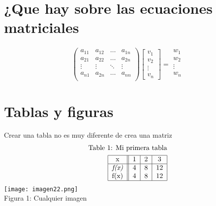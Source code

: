 \documentclass{article}
\begin{document}
    \section{¿Que hay sobre las ecuaciones matriciales} 
    \begin{align*}
        \begin{pmatrix}
            a_{11} & a_{12} & \dots & a_{1n} \\
            a_{21} & a_{22} & \dots & a_{2n} \\
            \vdots & \vdots & \ddots & \vdots \\
            a_{n1} & a_{2n} & \dots & a_{nn} \\
        \end{pmatrix}
        \begin{bmatrix}
            v_1 \\
            v_2 \\
            \vdots \\
            v_n
        \end{bmatrix}
        =
        \begin{matrix}
            w_1 \\
            w_2 \\
            \vdots \\
            w_n \\
        \end{matrix}        
    \end{align*}
    \section{Tablas y figuras}
    Crear una tabla no es muy diferente de crea una matriz
    \begin{align*}
        \text{Table 1: Mi primera tabla} \\
        \begin{tabular}{|c||c|c|c|}
             \hline
             x & 1 & 2 & 3 \\
             \hline
             \textit{f(x)} & 4 & 8 & 12 \\
             f(x) & 4 & 8 & 12 \\
             \hline
        \end{tabular}
    \end{align*}
    \texttt{[image: imagen22.png]} \\
    \centering Figura 1: Cualquier imagen
\end{document}
